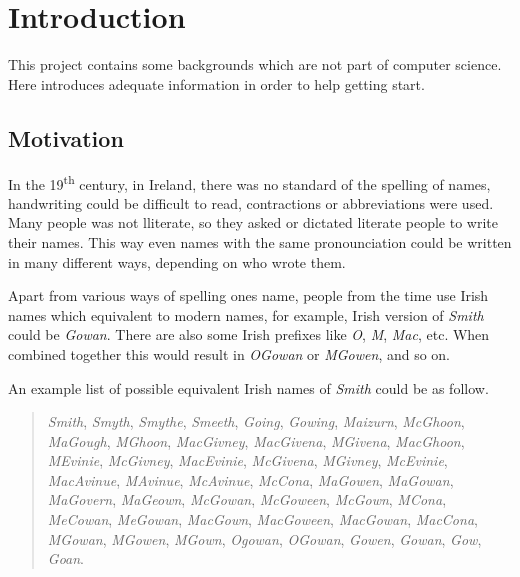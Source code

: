 \chapter{Introduction}
\label{ch:introduction}

This project contains some backgrounds which are not part of computer science.
Here introduces adequate information in order to help getting start.

\section{Motivation}

In the 19\textsuperscript{th} century, in Ireland, there was no standard
of the spelling of names, handwriting could be difficult to read,
contractions or abbreviations were used. Many people was not lliterate,
so they asked or dictated literate people to write their names.
This way even names with the same pronounciation could be written
in many different ways, depending on who wrote them.

Apart from various ways of spelling one\textquotesingle s name,
people from the time use Irish names which equivalent to modern names,
for example, Irish version of \emph{Smith} could be \emph{Gowan}.
There are also some Irish prefixes like \emph{O\textquotesingle}, \emph{M\textquotesingle}, \emph{Mac},
etc. When combined together this would result in \emph{O\textquotesingle Gowan} or
\emph{M\textquotesingle Gowen}, and so on.

An example list of possible equivalent Irish names of \emph{Smith}
could be as follow.

\begin{quotation} \noindent
\emph{Smith},
\emph{Smyth},
\emph{Smythe},
\emph{Smeeth},
\emph{Going},
\emph{Gowing},
\emph{Maizurn},
\emph{McGhoon},
\emph{MaGough},
\emph{M\textquotesingle Ghoon},
\emph{MacGivney},
\emph{MacGivena},
\emph{M\textquotesingle Givena},
\emph{MacGhoon},
\emph{M\textquotesingle Evinie},
\emph{McGivney},
\emph{MacEvinie},
\emph{McGivena},
\emph{M\textquotesingle Givney},
\emph{McEvinie},
\emph{MacAvinue},
\emph{M\textquotesingle Avinue},
\emph{McAvinue},
\emph{McCona},
\emph{MaGowen},
\emph{MaGowan},
\emph{MaGovern},
\emph{MaGeown},
\emph{McGowan},
\emph{McGoween},
\emph{McGown},
\emph{M\textquotesingle Cona},
\emph{MeCowan},
\emph{MeGowan},
\emph{MacGown},
\emph{MacGoween},
\emph{MacGowan},
\emph{MacCona},
\emph{M\textquotesingle Gowan},
\emph{M\textquotesingle Gowen},
\emph{M\textquotesingle Gown},
\emph{Ogowan},
\emph{O\textquotesingle Gowan},
\emph{Gowen},
\emph{Gowan},
\emph{Gow},
\emph{Goan}.
\end{quotation}

